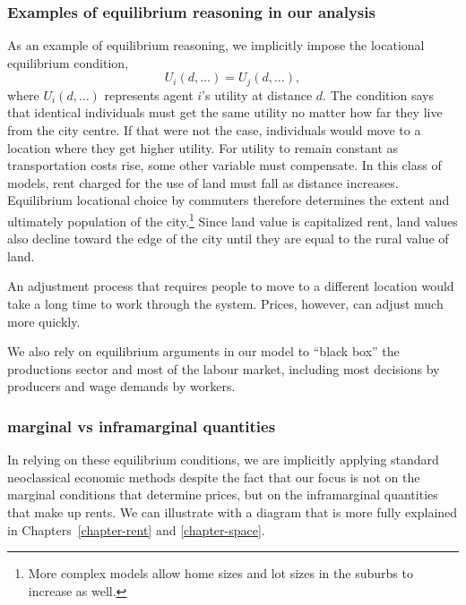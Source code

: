 \subsubsection{Examples of  \gls{equilibrium reasoning} in our analysis}

As an example of \gls{equilibrium reasoning},  we implicitly impose the locational equilibrium condition,
\[U_i(d,\dots)=U_j(d, \dots),\]where $U_i(d,\dots)$ represents agent $i$'s utility at distance $d$. 
The condition says that identical individuals must get the same utility no matter how far they live from the city centre. If that were not the case, individuals would move to a location where they get higher utility. For utility to remain constant as  transportation costs  rise, some other variable must compensate. In this class of models, rent charged for the use of land must fall as distance increases. Equilibrium locational choice by commuters therefore determines the extent and ultimately  population of the city.\footnote{More complex models allow home sizes and lot sizes in the suburbs to increase as well.} Since land value  is \gls{capitalize}d rent, land values also decline toward the edge of the city until they are equal to the rural value of land. 

An adjustment process that requires people to move to a different location would take a long time to work through the system. Prices, however, can adjust much more quickly.




We also rely on equilibrium arguments in our model to ``black box'' the productions sector and most of  the labour market, including most decisions by producers and wage demands by workers. 


\subsubsection{\Gls{marginal} vs \gls{inframarginal} quantities}
In relying on these equilibrium conditions, we are implicitly applying standard neoclassical economic methods despite the fact that our focus is not on the \gls{marginal} conditions that determine prices, but on the \gls{inframarginal} quantities that make up rents. We can illustrate with a diagram that is more fully explained in Chapters~\ref{chapter-rent} and \ref{chapter-space}. 

